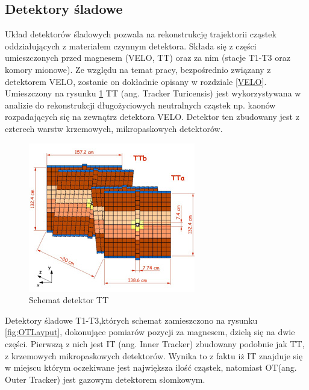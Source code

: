 \subsection{Detektory śladowe}
Układ detektorów śladowych pozwala na rekonstrukcję trajektorii cząstek oddziałujących z materiałem czynnym detektora. Składa się z części umieszczonych przed magnesem (VELO, TT) oraz za nim (stacje T1-T3 oraz komory mionowe). Ze względu na temat pracy, bezpośrednio związany z detektorem VELO, zostanie on dokładnie opisany w rozdziale \ref{VELO}. Umieszczony na rysunku \ref{fig:TTlayout} TT (ang. Tracker Turicensis) jest wykorzystywana w analizie do rekonstrukcji długożyciowych neutralnych cząstek np. kaonów rozpadających się na zewnątrz detektora VELO. Detektor ten zbudowany jest z czterech warstw krzemowych, mikropaskowych detektorów. 
\begin{figure}[th]
  \centering
  \includegraphics[scale=1]{rozdzial2/TT-layout.jpg}
  \caption{Schemat detektor TT \cite{public}}
  \label{fig:TTlayout}
\end{figure}
Detektory śladowe T1-T3,których schemat zamieszczono na rysunku \ref{fig:OTLayput},  dokonujące pomiarów pozycji za magnesem, dzielą się na dwie części. Pierwszą z nich jest IT (ang. Inner Tracker) zbudowany podobnie jak TT, z krzemowych mikropaskowych detektorów. Wynika to z faktu iż IT znajduje się w miejscu którym oczekiwane jest największa ilość cząstek, natomiast OT(ang. Outer Tracker) jest gazowym detektorem słomkowym.

